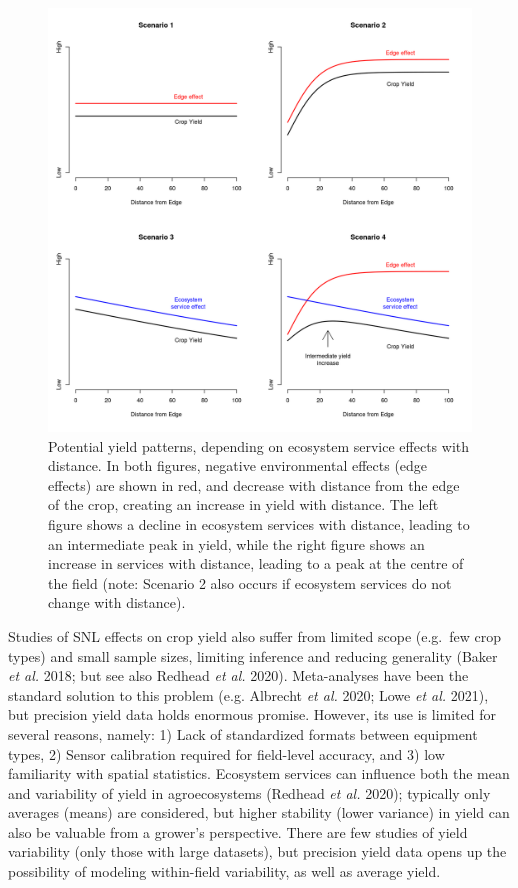 \documentclass[]{elsarticle} %
\begin{document}
\begin{figure}
\includegraphics[width=1\linewidth]{../Figures/ExamplePlots/hypotheses} \caption{Potential yield patterns, depending on ecosystem service effects with distance. In both figures, negative environmental effects (edge effects) are shown in red, and decrease with distance from the edge of the crop, creating an increase in yield with distance. The left figure shows a decline in ecosystem services with distance, leading to an intermediate peak in yield, while the right figure shows an increase in services with distance, leading to a peak at the centre of the field (note: Scenario 2 also occurs if ecosystem services do not change with distance).}\label{fig:hypotheses}
\end{figure}

Studies of SNL effects on crop yield also suffer from limited scope (e.g.~few crop types) and small sample sizes, limiting inference and reducing generality (Baker \emph{et al.} 2018; but see also Redhead \emph{et al.} 2020).
Meta-analyses have been the standard solution to this problem (e.g. Albrecht \emph{et al.} 2020; Lowe \emph{et al.} 2021), but precision yield data holds enormous promise.
However, its use is limited for several reasons, namely: 1) Lack of standardized formats between equipment types, 2) Sensor calibration required for field-level accuracy, and 3) low familiarity with spatial statistics.
Ecosystem services can influence both the mean and variability of yield in agroecosystems (Redhead \emph{et al.} 2020); typically only averages (means) are considered, but higher stability (lower variance) in yield can also be valuable from a grower's perspective.
There are few studies of yield variability (only those with large datasets), but precision yield data opens up the possibility of modeling within-field variability, as well as average yield.
\end{document}
